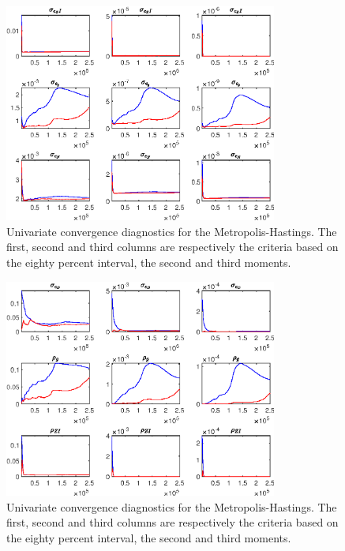  
\begin{figure}[H]
\centering 
\includegraphics[width=0.80\textwidth]{BRS_growth_alt/Output/BRS_growth_alt_udiag1}
\caption{Univariate convergence diagnostics for the Metropolis-Hastings.
The first, second and third columns are respectively the criteria based on
the eighty percent interval, the second and third moments.}\label{Fig:UnivariateDiagnostics:1}
\end{figure}

\begin{figure}[H]
\centering 
\includegraphics[width=0.80\textwidth]{BRS_growth_alt/Output/BRS_growth_alt_udiag2}
\caption{Univariate convergence diagnostics for the Metropolis-Hastings.
The first, second and third columns are respectively the criteria based on
the eighty percent interval, the second and third moments.}\label{Fig:UnivariateDiagnostics:2}
\end{figure}

